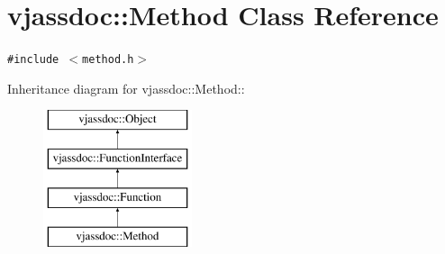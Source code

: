 \hypertarget{classvjassdoc_1_1Method}{
\section{vjassdoc::Method Class Reference}
\label{classvjassdoc_1_1Method}
}
{\tt \#include $<$method.h$>$}

Inheritance diagram for vjassdoc::Method::\begin{figure}[H]
\begin{center}
\leavevmode
\includegraphics[height=4cm]{classvjassdoc_1_1Method}
\end{center}
\end{figure}
